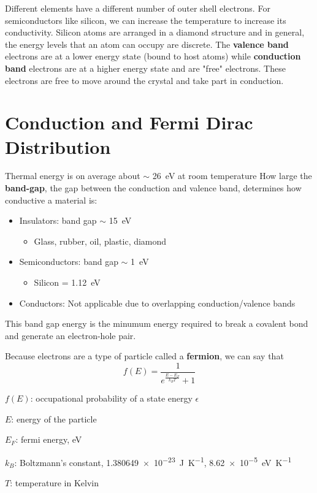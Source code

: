 Different elements have a different number of outer shell electrons. For semiconductors like silicon, we can increase the temperature to increase its conductivity. Silicon atoms are arranged in a diamond structure and in general, the energy levels that an atom can occupy are discrete. The \textbf{valence band} electrons are at a lower energy state (bound to host atoms) while \textbf{conduction band} electrons are at a higher energy state and are "free" electrons. These electrons are free to move around the crystal and take part in conduction. 

\section{Conduction and Fermi Dirac Distribution}
Thermal energy is on average about $\sim$ \qty{26}{\eV} at room temperature How large the \textbf{band-gap}, the gap between the conduction and valence band, determines how conductive a material is:
\begin{itemize}
    \item Insulators: band gap $\sim$ \qty{15}{\eV}
    \begin{itemize}
        \item Glass, rubber, oil, plastic, diamond
    \end{itemize}
    \item Semiconductors: band gap $\sim$ \qty{1}{\eV}
    \begin{itemize}
        \item Silicon = \qty{1.12}{\eV}
    \end{itemize}
    \item Conductors: Not applicable due to overlapping conduction/valence bands
\end{itemize}
This band gap energy is the minumum energy required to break a covalent bond and generate an electron-hole pair.

Because electrons are a type of particle called a \textbf{fermion}, we can say that 
\[f(E) = \frac{1}{e^{\frac{E - E_F}{k_B T}} + 1}\]
\begin{gline}
    \item $f(E)$: occupational probability of a state energy $\epsilon$
    \item $E$: energy of the particle
    \item $E_F$: fermi energy, eV
    \item $k_B$: Boltzmann's constant, \qty{1.380649e-23}{\joule\per\kelvin}, 
    \qty{8.62e-5}{\eV\per\kelvin}
    \item $T$: temperature in Kelvin
\end{gline}

